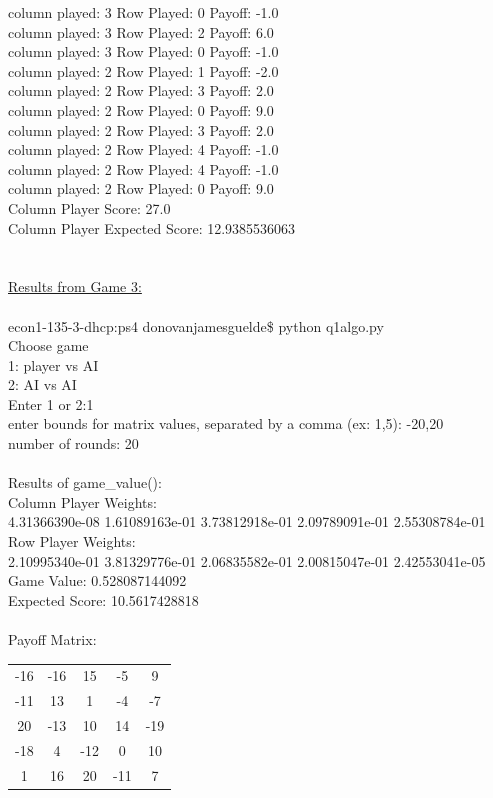 \documentclass[11pt, oneside]{article}   	%
\begin{document}
column played: 3   Row Played: 0 Payoff: -1.0\\
column played: 3   Row Played: 2 Payoff: 6.0\\
column played: 3   Row Played: 0 Payoff: -1.0\\
column played: 2   Row Played: 1 Payoff: -2.0\\
column played: 2   Row Played: 3 Payoff: 2.0\\
column played: 2   Row Played: 0 Payoff: 9.0\\
column played: 2   Row Played: 3 Payoff: 2.0\\
column played: 2   Row Played: 4 Payoff: -1.0\\
column played: 2   Row Played: 4 Payoff: -1.0\\
column played: 2   Row Played: 0 Payoff: 9.0\\
Column Player Score: 27.0\\
Column Player Expected Score: 12.9385536063\\
\\
\\
\indent \underline{Results from Game 3:}\\\\
econ1-135-3-dhcp:ps4 donovanjamesguelde\$ python q1algo.py\\
Choose game\\
1: player vs AI\\
2: AI vs AI\\
Enter 1 or 2:1\\
enter bounds for matrix values, separated by a comma (ex: 1,5): -20,20\\
number of rounds: 20\\
\\
Results of game\_value():\\
Column Player Weights:\\
\indent 4.31366390e-08   1.61089163e-01   3.73812918e-01   2.09789091e-01   2.55308784e-01\\
Row Player Weights:\\
\indent2.10995340e-01   3.81329776e-01   2.06835582e-01   2.00815047e-01   2.42553041e-05\\
Game Value: 0.528087144092\\
Expected Score: 10.5617428818 \\
\\
Payoff Matrix:\\
\begin{tabular}{c c c c c}
-16 & -16 & 15 & -5 &  9\\
 -11 & 13 &  1 & -4 & -7\\
  20 &-13 & 10  &14& -19\\
 -18 &  4& -12 &  0 & 10\\
 1 & 16 & 20 &-11  & 7\\
\end{tabular}
\end{document}
